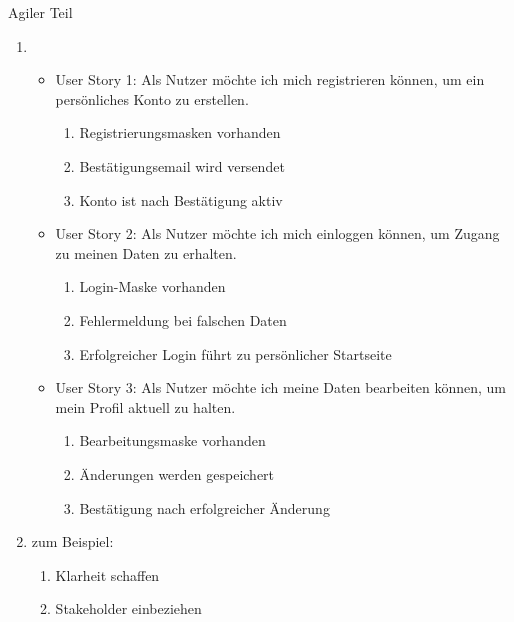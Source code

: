 \documentclass{article}
\begin{document}
\begin{exercise}{Agiler Teil}
\begin{enumerate}
          \begin{solution}
            \begin{enumerate}
              \item
                    \begin{itemize}
                      \item User Story 1: Als Nutzer möchte ich mich registrieren können, um ein persönliches Konto zu erstellen.
                            \begin{enumerate}
                              \item Registrierungsmasken vorhanden
                              \item Bestätigungsemail wird versendet
                              \item Konto ist nach Bestätigung aktiv
                            \end{enumerate}
                      \item User Story 2: Als Nutzer möchte ich mich einloggen können, um Zugang zu meinen Daten zu erhalten.
                            \begin{enumerate}
                              \item Login-Maske vorhanden
                              \item Fehlermeldung bei falschen Daten
                              \item Erfolgreicher Login führt zu persönlicher Startseite
                            \end{enumerate}
                      \item User Story 3: Als Nutzer möchte ich meine Daten bearbeiten können, um mein Profil aktuell zu halten.
                            \begin{enumerate}
                              \item Bearbeitungsmaske vorhanden
                              \item Änderungen werden gespeichert
                              \item Bestätigung nach erfolgreicher Änderung
                            \end{enumerate}
                    \end{itemize}
              \item zum Beispiel:
                    \begin{enumerate}
                      \item Klarheit schaffen
                      \item Stakeholder einbeziehen

\end{enumerate}
\end{enumerate}
\end{solution}
\end{enumerate}
\end{exercise}
\end{document}
